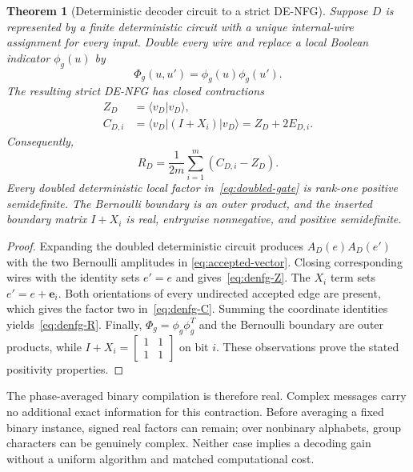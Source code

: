 \documentclass[journal]{IEEEtran}
\newtheorem{theorem}{Theorem}
\theoremstyle{definition}
\theoremstyle{remark}
\begin{document}
\begin{theorem}[Deterministic decoder circuit to a strict DE-NFG]
\label{thm:denfg}
Suppose $D$ is represented by a finite deterministic circuit with a unique
internal-wire assignment for every input.  Double every wire and replace a
local Boolean indicator $\phi_g(u)$ by
\begin{equation}
 \Phi_g(u,u')=\phi_g(u)\phi_g(u').
 \label{eq:doubled-gate}
\end{equation}
The resulting strict DE-NFG has closed contractions
\begin{align}
 Z_D&=\langle v_D|v_D\rangle,
 \label{eq:denfg-Z}\\
 C_{D,i}&=\langle v_D|(I+X_i)|v_D\rangle
          =Z_D+2E_{D,i}.
 \label{eq:denfg-C}
\end{align}
Consequently,
\begin{equation}
 R_D=\frac{1}{2m}\sum_{i=1}^m(C_{D,i}-Z_D).
 \label{eq:denfg-R}
\end{equation}
Every doubled deterministic local factor in~\eqref{eq:doubled-gate} is
rank-one positive semidefinite.  The Bernoulli boundary is an outer product,
and the inserted boundary matrix $I+X_i$ is real, entrywise nonnegative, and
positive semidefinite.
\end{theorem}

\begin{proof}
Expanding the doubled deterministic circuit produces
$A_D(e)A_D(e')$ with the two Bernoulli amplitudes in
\eqref{eq:accepted-vector}.  Closing corresponding wires with the identity
sets $e'=e$ and gives~\eqref{eq:denfg-Z}.  The $X_i$ term sets
$e'=e+\mathbf e_i$.  Both orientations of every undirected accepted edge are present,
which gives the factor two in~\eqref{eq:denfg-C}.  Summing the coordinate
identities yields~\eqref{eq:denfg-R}.  Finally,
$\Phi_g=\phi_g\phi_g^T$ and the Bernoulli boundary are outer products, while
$I+X_i=\left[\begin{smallmatrix}1&1\\1&1\end{smallmatrix}\right]$ on bit $i$.
These observations prove the stated positivity properties.
\end{proof}

The phase-averaged binary compilation is therefore real.  Complex messages
carry no additional exact information for this contraction.  Before averaging
a fixed binary instance, signed real factors can remain; over nonbinary
alphabets, group characters can be genuinely complex.  Neither case implies
a decoding gain without a uniform algorithm and matched computational cost.
\end{document}
